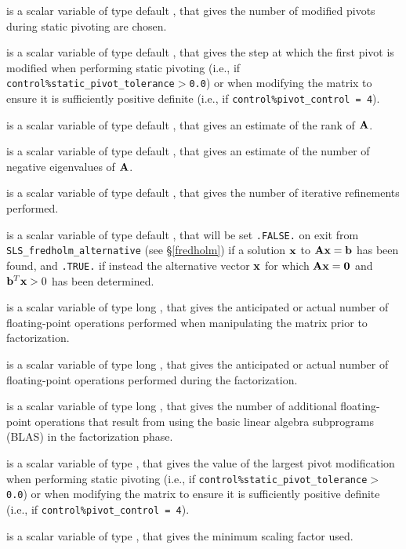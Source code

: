 \documentclass{galahad}
\newcommand{\packagename}{SLS}
\begin{document}
\begin{description}
 is a scalar variable of type default \integer,
that gives the number of modified pivots during static pivoting are chosen.

 is a scalar variable of type default \integer,
that gives the step at which the first pivot is modified when performing
static pivoting (i.e., if {\tt control\%static\_pivot\_tolerance$>$0.0})
or when modifying the matrix to ensure it is sufficiently positive definite
(i.e., if {\tt control\%pivot\_control = 4}).

 is a scalar variable of type default \integer,
that gives an estimate of the rank of ${\mathbf{A}}$.

 is a scalar variable of type default \integer,
that gives an estimate of the number of negative eigenvalues of ${\mathbf{A}}$.

 is a scalar variable of type default \integer,
that gives the number of iterative refinements performed.

 is a scalar variable of type default \logical,
that will be set {\tt .FALSE.} on exit from
{\tt \packagename\_fredholm\_\-alternative} (see \S\ref{fredholm})
if a solution ${\mathbf{x}}$ to ${\mathbf{A}} {\mathbf{x}} = {\mathbf{b}}$ has been found,
and {\tt .TRUE.} if instead the alternative vector ${\mathbf{x}}$ for which
${\mathbf{A}} {\mathbf{x}} = {\mathbf{0}}$ and ${\mathbf{b}}^T {\mathbf{x}} > 0$ has been determined.

 is a scalar variable of type long \integer,
that gives the anticipated or actual number of floating-point operations
performed when manipulating the matrix prior to factorization.

 is a scalar variable of type long \integer,
that gives the anticipated or actual number of floating-point operations
performed during the factorization.

 is a scalar variable of type long \integer,
that gives the number of additional floating-point operations
that result from using the basic linear algebra subprograms (BLAS)
in the factorization phase.

 is a scalar variable of type \realdp,
that gives the value of the largest pivot modification when performing
static pivoting (i.e., if {\tt control\%static\_pivot\_\-tolerance$>$0.0})
or when modifying the matrix to ensure it is sufficiently positive definite
(i.e., if {\tt control\-\%pivot\_control = 4}).

 is a scalar variable of type \realdp,
that gives the minimum scaling factor used.


\end{description}
\end{document}
